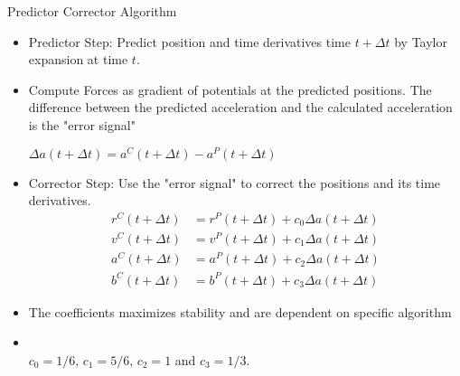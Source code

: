 \documentclass[slidestop,mathserif,compress,xcolor=svgnames]{beamer}
\newenvironment{bblock}[0]
{
\begin{beamerboxesrounded}[upper=uppercol1,lower=lowercol1,shadow=true]}
{\end{beamerboxesrounded}}
\begin{document}
\begin{frame}[allowframebreaks]
\begin{bblock}{Predictor Corrector Algorithm}
  \begin{itemize}
  \item Predictor Step: Predict position and time derivatives  time $t+\Delta t$ by Taylor expansion at time $t$.
  \item Compute Forces as gradient of potentials at the predicted positions. The difference between the predicted acceleration and the calculated acceleration is the "error signal"
    \begin{center}
      $\Delta a(t+\Delta t) = a^C(t+\Delta t) - a^P(t+\Delta t)$
    \end{center}
  \item Corrector Step: Use the "error signal" to correct the positions and its time derivatives. 
    \begin{align*}
      r^C(t+\Delta t)  &= r^P(t+\Delta t) + c_0\Delta a(t+\Delta t)\\
      v^C(t+\Delta t)  &= v^P(t+\Delta t) + c_1\Delta a(t+\Delta t)\\
      a^C(t+\Delta t)  &= a^P(t+\Delta t) + c_2\Delta a(t+\Delta t)\\
      b^C(t+\Delta t)  &= b^P(t+\Delta t) + c_3\Delta a(t+\Delta t)
    \end{align*}
  \item The coefficients maximizes stability and are dependent on specific algorithm
  \item {\color{blue}{\bf Gear Predictor Corrector Algorithm:}\\ $c_0=1/6$, $c_1=5/6$, $c_2=1$ and $c_3=1/3$.}
  \end{itemize}
\end{bblock}



\end{frame}
\end{document}
